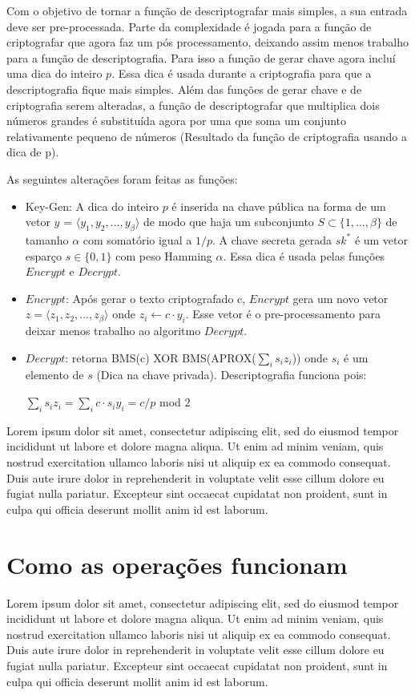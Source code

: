 Com o objetivo de tornar a função de descriptografar mais simples, a sua entrada deve ser pre-processada. Parte da complexidade é jogada para a função de criptografar que agora faz um pós processamento, deixando assim menos trabalho para a função de descriptografia.
Para isso a função de gerar chave agora incluí uma dica do inteiro $p$. Essa dica é usada durante a criptografia para que a descriptografia fique mais simples.
Além das funções de gerar chave e de criptografia serem alteradas, a função de descriptografar que multiplica dois números grandes é substituída agora por uma que soma um conjunto relativamente pequeno de números (Resultado da função de criptografia usando a dica de p).
  	
As seguintes alterações foram feitas as funções:
\begin{itemize}
	\item Key-Gen: A dica do inteiro $p$ é inserida na chave pública na forma de um vetor $y$ = $ \langle y_1, y_2, ..., y_{\beta} \rangle $ de modo que haja um subconjunto  $ S \subset \lbrace 1,...,\beta \rbrace $ de tamanho $ \alpha $ com somatório igual a $1/p$. A chave secreta gerada $sk^{*}$ é um vetor esparço $s \in \lbrace 0,1 \rbrace $ com peso Hamming $ \alpha $. Essa dica é usada pelas funções $Encrypt$ e $Decrypt$.
  	\item $Encrypt$: Após gerar o texto criptografado c, $Encrypt$ gera um novo vetor $z = \langle z_1, z_2, ..., z_{\beta} \rangle $ onde $ z_i \leftarrow c \cdot y_i $. Esse vetor é o pre-processamento para deixar menos trabalho ao algoritmo $Decrypt$.
  	\item $Decrypt$: retorna BMS(c) XOR BMS(APROX($ \sum_{i}^{} s_i z_i $)) onde $s_i$ é um elemento de $s$ (Dica na chave privada). Descriptografia funciona pois: \begin{center} $\sum_{i}^{} s_i z_i = \sum_{i}^{} c \cdot s_i y_i = c/p$ mod $2$ \end{center}	
\end{itemize}
	
Lorem ipsum dolor sit amet, consectetur adipiscing elit, sed do eiusmod tempor incididunt ut labore et dolore magna aliqua. Ut enim ad minim veniam, quis nostrud exercitation ullamco laboris nisi ut aliquip ex ea commodo consequat. Duis aute irure dolor in reprehenderit in voluptate velit esse cillum dolore eu fugiat nulla pariatur. Excepteur sint occaecat cupidatat non proident, sunt in culpa qui officia deserunt mollit anim id est laborum.
  
\section{Como as operações funcionam}
Lorem ipsum dolor sit amet, consectetur adipiscing elit, sed do eiusmod tempor incididunt ut labore et dolore magna aliqua. Ut enim ad minim veniam, quis nostrud exercitation ullamco laboris nisi ut aliquip ex ea commodo consequat. Duis aute irure dolor in reprehenderit in voluptate velit esse cillum dolore eu fugiat nulla pariatur. Excepteur sint occaecat cupidatat non proident, sunt in culpa qui officia deserunt mollit anim id est laborum.
  
